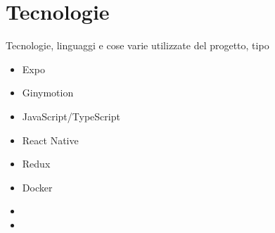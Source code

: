 
\chapter{Tecnologie}
Tecnologie, linguaggi e cose varie utilizzate del progetto, tipo 
\begin{itemize}
	\item Expo
	\item Ginymotion
	\item JavaScript/TypeScript
	\item React Native
	\item Redux
	\item Docker
	\item {}
	\item {}
\end{itemize}